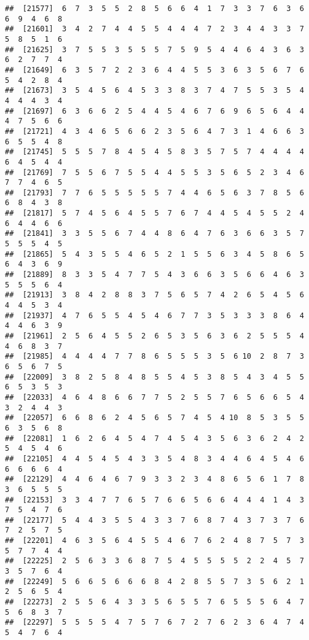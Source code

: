 \documentclass[
]{book}
\begin{document}
\begin{verbatim}
##  [21577]  6  7  3  5  5  2  8  5  6  6  4  1  7  3  3  7  6  3  6  6  9  4  6  8
##  [21601]  3  4  2  7  4  4  5  5  4  4  4  7  2  3  4  4  3  3  7  5  8  5  1  6
##  [21625]  3  7  5  5  3  5  5  5  7  5  9  5  4  4  6  4  3  6  3  6  2  7  7  4
##  [21649]  6  3  5  7  2  2  3  6  4  4  5  5  3  6  3  5  6  7  6  5  4  2  8  4
##  [21673]  3  5  4  5  6  4  5  3  3  8  3  7  4  7  5  5  3  5  4  4  4  4  3  4
##  [21697]  6  3  6  6  2  5  4  4  5  4  6  7  6  9  6  5  6  4  4  4  7  5  6  6
##  [21721]  4  3  4  6  5  6  6  2  3  5  6  4  7  3  1  4  6  6  3  6  5  5  4  8
##  [21745]  5  5  5  7  8  4  5  4  5  8  3  5  7  5  7  4  4  4  4  6  4  5  4  4
##  [21769]  7  5  5  6  7  5  5  4  4  5  5  3  5  6  5  2  3  4  6  7  7  4  6  5
##  [21793]  7  7  6  5  5  5  5  5  7  4  4  6  5  6  3  7  8  5  6  6  8  4  3  8
##  [21817]  5  7  4  5  6  4  5  5  7  6  7  4  4  5  4  5  5  2  4  6  4  4  6  6
##  [21841]  3  3  5  5  6  7  4  4  8  6  4  7  6  3  6  6  3  5  7  5  5  5  4  5
##  [21865]  5  4  3  5  5  4  6  5  2  1  5  5  6  3  4  5  8  6  5  6  4  3  6  9
##  [21889]  8  3  3  5  4  7  7  5  4  3  6  6  3  5  6  6  4  6  3  5  5  5  6  4
##  [21913]  3  8  4  2  8  8  3  7  5  6  5  7  4  2  6  5  4  5  6  4  4  5  3  4
##  [21937]  4  7  6  5  5  4  5  4  6  7  7  3  5  3  3  3  8  6  4  4  4  6  3  9
##  [21961]  2  5  6  4  5  5  2  6  5  3  5  6  3  6  2  5  5  5  4  4  6  8  3  7
##  [21985]  4  4  4  4  7  7  8  6  5  5  5  3  5  6 10  2  8  7  3  6  5  6  7  5
##  [22009]  3  8  2  5  8  4  8  5  5  4  5  3  8  5  4  3  4  5  5  6  5  3  5  3
##  [22033]  4  6  4  8  6  6  7  7  5  2  5  5  7  6  5  6  6  5  4  3  2  4  4  3
##  [22057]  6  6  8  6  2  4  5  6  5  7  4  5  4 10  8  5  3  5  5  6  3  5  6  8
##  [22081]  1  6  2  6  4  5  4  7  4  5  4  3  5  6  3  6  2  4  2  5  4  5  4  6
##  [22105]  4  4  5  4  5  4  3  3  5  4  8  3  4  4  6  4  5  4  6  6  6  6  6  4
##  [22129]  4  4  6  4  6  7  9  3  3  2  3  4  8  6  5  6  1  7  8  3  6  5  5  5
##  [22153]  3  3  4  7  7  6  5  7  6  6  5  6  6  4  4  4  1  4  3  7  5  4  7  6
##  [22177]  5  4  4  3  5  5  4  3  3  7  6  8  7  4  3  7  3  7  6  7  2  5  7  5
##  [22201]  4  6  3  5  6  4  5  5  4  6  7  6  2  4  8  7  5  7  3  5  7  7  4  4
##  [22225]  2  5  6  3  3  6  8  7  5  4  5  5  5  5  2  2  4  5  7  3  5  7  6  4
##  [22249]  5  6  6  5  6  6  6  8  4  2  8  5  5  7  3  5  6  2  1  2  5  6  5  4
##  [22273]  2  5  5  6  4  3  3  5  6  5  5  7  6  5  5  5  6  4  7  5  6  8  3  7
##  [22297]  5  5  5  5  4  7  5  7  6  7  2  7  6  2  3  6  4  7  4  5  4  7  6  4

\end{verbatim}
\end{document}
